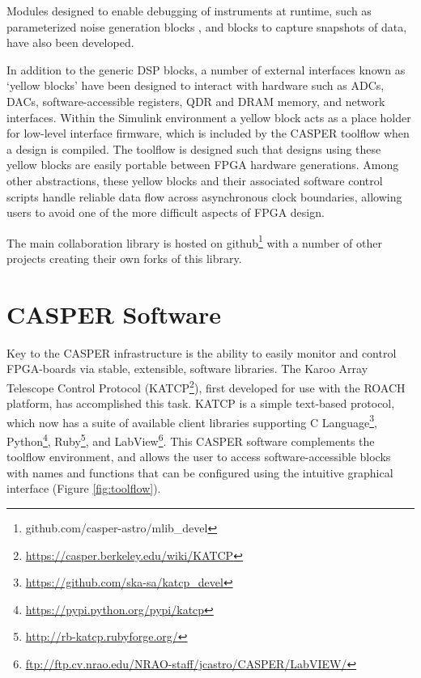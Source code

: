 \documentclass{ws-jai}
\begin{document}
Modules designed to enable debugging of instruments at runtime,
such as parameterized noise generation blocks \citep{noisegen}, and blocks
to capture snapshots of data, have also been developed.


In addition to the generic DSP blocks, a number of external interfaces known as
`yellow blocks' have been designed to interact with hardware such as
ADCs, DACs, software-accessible registers, QDR and DRAM memory, and network
interfaces. 
Within the Simulink environment a yellow block acts as a place holder for low-level interface firmware, which is included by the CASPER toolflow when a design is compiled. The toolflow is designed such that designs using these yellow blocks are easily portable between FPGA hardware generations.
Among other abstractions, these yellow blocks and their associated software control scripts handle reliable data flow across asynchronous clock boundaries, allowing users to avoid one of the more difficult aspects of FPGA design.

The main collaboration library is hosted on
github\footnote{github.com/casper-astro/mlib\_devel} with a number of
other projects creating their own forks of this library.

\section{CASPER Software} \label{sec:Software}
Key to the CASPER infrastructure is the ability to easily monitor and control
FPGA-boards via stable, extensible, software libraries. The Karoo
Array Telescope Control Protocol
(KATCP\footnote{\url{https://casper.berkeley.edu/wiki/KATCP}}), first developed for use with the ROACH platform, has accomplished this task. KATCP is a simple text-based protocol, which now has a suite of available
client libraries supporting C Language\footnote{\url{https://github.com/ska-sa/katcp_devel}}, Python\footnote{\url{https://pypi.python.org/pypi/katcp}}, Ruby\footnote{\url{http://rb-katcp.rubyforge.org/}}, and LabView\footnote{\url{ftp://ftp.cv.nrao.edu/NRAO-staff/jcastro/CASPER/LabVIEW/}}.
This CASPER software complements the toolflow environment, and allows the user to access software-accessible blocks with names and functions that can be configured using the intuitive graphical interface (Figure \ref{fig:toolflow}). 
\end{document}
